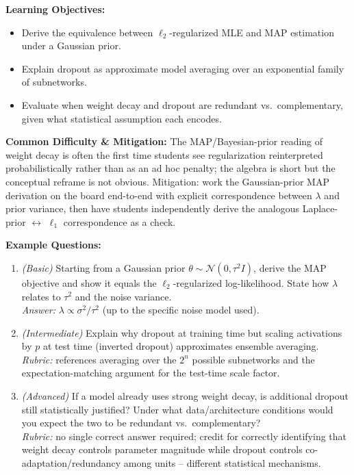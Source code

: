 \documentclass[11pt]{article}
\begin{document}
\textbf{Learning Objectives:}
\begin{itemize}
  \item Derive the equivalence between $\ell_2$-regularized MLE and MAP estimation under a Gaussian prior.
  \item Explain dropout as approximate model averaging over an exponential family of subnetworks.
  \item Evaluate when weight decay and dropout are redundant vs.\ complementary, given what statistical assumption each encodes.
\end{itemize}

\textbf{Common Difficulty \& Mitigation:} The MAP/Bayesian-prior reading of weight decay is often the first time students see regularization reinterpreted probabilistically rather than as an ad hoc penalty; the algebra is short but the conceptual reframe is not obvious. Mitigation: work the Gaussian-prior MAP derivation on the board end-to-end with explicit correspondence between $\lambda$ and prior variance, then have students independently derive the analogous Laplace-prior $\leftrightarrow$ $\ell_1$ correspondence as a check.

\textbf{Example Questions:}
\begin{enumerate}
  \item \textit{(Basic)} Starting from a Gaussian prior $\theta \sim \mathcal N(0, \tau^2 I)$, derive the MAP objective and show it equals the $\ell_2$-regularized log-likelihood. State how $\lambda$ relates to $\tau^2$ and the noise variance. \\
  \textit{Answer:} $\lambda \propto \sigma^2/\tau^2$ (up to the specific noise model used).
  \item \textit{(Intermediate)} Explain why dropout at training time but scaling activations by $p$ at test time (inverted dropout) approximates ensemble averaging. \\
  \textit{Rubric:} references averaging over the $2^n$ possible subnetworks and the expectation-matching argument for the test-time scale factor.
  \item \textit{(Advanced)} If a model already uses strong weight decay, is additional dropout still statistically justified? Under what data/architecture conditions would you expect the two to be redundant vs.\ complementary? \\
  \textit{Rubric:} no single correct answer required; credit for correctly identifying that weight decay controls parameter magnitude while dropout controls co-adaptation/redundancy among units -- different statistical mechanisms.
\end{enumerate}
\end{document}
